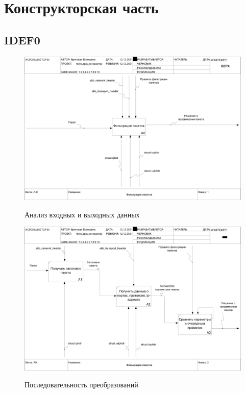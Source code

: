 \section{Конструкторская часть}

\subsection{IDEF0}
\begin{figure}[h]
	\begin{center}
		{\includegraphics[scale = 0.3]{img/idef0/main.png}}
		\caption{Анализ входных и выходных данных}
		\label{fig29:image}
	\end{center}
\end{figure}


\begin{figure}[h!]
	\begin{center}
		{\includegraphics[scale = 0.3]{img/idef0/down.png}}
		\caption{Последовательность преобразований}
		\label{fig200:image}
	\end{center}
\end{figure}

